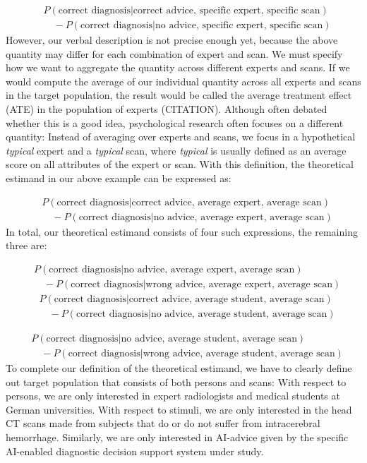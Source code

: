 \documentclass[
  man,floatsintext]{apa6}
\begin{document}
\[
\begin{aligned}
& P(\text{correct diagnosis} | \text{correct advice, specific expert, specific scan}) \\
& \quad - P(\text{correct diagnosis} | \text{no advice, specific expert, specific scan})
\end{aligned}
\]
However, our verbal description is not precise enough yet, because the above quantity may differ for each combination of expert and scan.
We must specify how we want to aggregate the quantity across different experts and scans.
If we would compute the average of our individual quantity across all experts and scans in the target population, the result would be called the average treatment effect (ATE) in the population of experts (CITATION).
Although often debated whether this is a good idea, psychological research often focuses on a different quantity:
Instead of averaging over experts and scans, we focus in a hypothetical \emph{typical} expert and a \emph{typical} scan, where \emph{typical} is usually defined as an average score on all attributes of the expert or scan.
With this definition, the theoretical estimand in our above example can be expressed as:

\[
\begin{aligned}
& P(\text{correct diagnosis} | \text{correct advice, average expert, average scan}) \\
& \quad - P(\text{correct diagnosis} | \text{no advice, average expert, average scan})
\end{aligned}
\]
In total, our theoretical estimand consists of four such expressions, the remaining three are:

\[
\begin{aligned}
& P(\text{correct diagnosis} | \text{no advice, average expert, average scan}) \\
& \quad - P(\text{correct diagnosis} | \text{wrong advice, average expert, average scan})
\end{aligned}
\]
\[
\begin{aligned}
& P(\text{correct diagnosis} | \text{correct advice, average student, average scan}) \\
& \quad - P(\text{correct diagnosis} | \text{no advice, average student, average scan})
\end{aligned}
\]

\[
\begin{aligned}
& P(\text{correct diagnosis} | \text{no advice, average student, average scan}) \\
& \quad - P(\text{correct diagnosis} | \text{wrong advice, average student, average scan})
\end{aligned}
\]
To complete our definition of the theoretical estimand, we have to clearly define out target population that consists of both persons and scans:
With respect to persons, we are only interested in expert radiologists and medical students at German universities.
With respect to stimuli, we are only interested in the head CT scans made from subjects that do or do not suffer from intracerebral hemorrhage.
Similarly, we are only interested in AI-advice given by the specific AI-enabled diagnostic decision support system under study.
\end{document}
